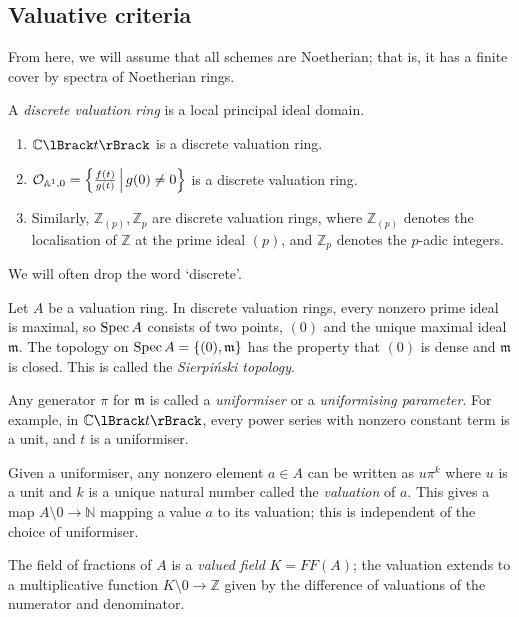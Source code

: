 \subsection{Valuative criteria}
From here, we will assume that all schemes are Noetherian; that is, it has a finite cover by spectra of Noetherian rings.
\begin{definition}
    A \emph{discrete valuation ring} is a local principal ideal domain.
\end{definition}
\begin{example}
    \begin{enumerate}
        \item \( \mathbb C\Brackets{t} \) is a discrete valuation ring.
        \item \( \mathcal O_{\mathbb A^1, 0} = \qty{\frac{f(t)}{g(t)} \,\middle|\,g(0) \neq 0} \) is a discrete valuation ring.
        \item Similarly, \( \mathbb Z_{(p)}, \mathbb Z_p \) are discrete valuation rings, where \( \mathbb Z_{(p)} \) denotes the localisation of \( \mathbb Z \) at the prime ideal \( (p) \), and \( \mathbb Z_p \) denotes the \( p \)-adic integers.
    \end{enumerate}
\end{example}
We will often drop the word `discrete'.
\begin{remark}
    Let \( A \) be a valuation ring.
    In discrete valuation rings, every nonzero prime ideal is maximal, so \( \operatorname{Spec} A \) consists of two points, \( (0) \) and the unique maximal ideal \( \mathfrak m \).
    The topology on \( \operatorname{Spec} A = \qty{(0), \mathfrak m} \) has the property that \( (0) \) is dense and \( \mathfrak m \) is closed.
    This is called the \emph{Sierpi\'nski topology}.

    Any generator \( \pi \) for \( \mathfrak m \) is called a \emph{uniformiser} or a \emph{uniformising parameter}.
    For example, in \( \mathbb C\Brackets{t} \), every power series with nonzero constant term is a unit, and \( t \) is a uniformiser.

    Given a uniformiser, any nonzero element \( a \in A \) can be written as \( u \pi^k \) where \( u \) is a unit and \( k \) is a unique natural number called the \emph{valuation} of \( a \).
    This gives a map \( A \setminus \qty{0} \to \mathbb N \) mapping a value \( a \) to its valuation; this is independent of the choice of uniformiser.

    The field of fractions of \( A \) is a \emph{valued field} \( K = FF(A) \); the valuation extends to a multiplicative function \( K \setminus \qty{0} \to \mathbb Z \) given by the difference of valuations of the numerator and denominator.
\end{remark}
